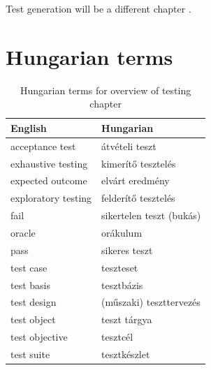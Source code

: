 Test generation will be a different chapter \cite{Anand13}.


\section{Hungarian terms}

\begin{table}[ht]
    \centering
    \small
    \caption{Hungarian terms for overview of testing chapter}
    \begin{tabular}{ll}
        \toprule
        \textbf{English} & \textbf{Hungarian} \\
        \midrule
        acceptance test & átvételi teszt \\
        exhaustive testing & kimerítő tesztelés \\
        expected outcome & elvárt eredmény \\
        exploratory testing & felderítő tesztelés \\
        fail & sikertelen teszt (bukás) \\
        oracle & orákulum \\
        pass & sikeres teszt \\
        test case & teszteset \\
        test basis & tesztbázis \\
        test design & (műszaki) teszttervezés \\
        test object & teszt tárgya \\
        test objective & tesztcél \\
        test suite & tesztkészlet \\
        \bottomrule
    \end{tabular}
    \label{tab:overview:hungarian-terms-testing-overview}
\end{table} 